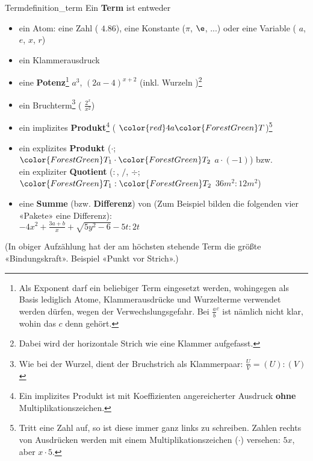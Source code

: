 \begin{definition}{Term}{definition_term}
  Ein \textbf{Term} ist entweder
  \begin{itemize}
  \item ein Atom: eine Zahl (\zB{} $4.86$), eine Konstante
    ($\pi$, $\e$, ...) oder  eine Variable (\zB{}   $a$, $e$, $x$, $r$)
  \item ein Klammerausdruck  
   \item eine \textbf{Potenz}\footnote{Als Exponent darf
     ein beliebiger Term eingesetzt werden, wohingegen als Basis
     lediglich Atome, Klammerausdrücke und Wurzelterme verwendet
     werden dürfen, wegen der Verwechslungsgefahr. Bei
     ${\frac{a}{b}}^c$ ist nämlich nicht klar, wohin das $c$ denn
     gehört.}
      \zB{}
     $a^3$, $(2a - 4)^{x+2}$ (inkl.  Wurzeln )\footnote{Dabei wird der
  horizontale Strich wie eine Klammer aufgefasst.}
    \item  ein Bruchterm\footnote{Wie bei der Wurzel, dient der Bruchstrich als Klammerpaar: $\frac{U}{V}=(U):(V)$} ( \zB{} $\frac{2^x}{x^2}$)
    \item ein implizites \textbf{Produkt}\footnote{Ein implizites
      Produkt ist mit Koeffizienten angereicherter Ausdruck
      \textbf{ohne} Multiplikationszeichen.} (\zB{}
      ${\color{red}4a}{\color{ForestGreen}T}$)\footnote{Tritt eine Zahl auf,
      so ist diese immer ganz links zu schreiben. Zahlen rechts von
      Ausdrücken werden mit einem Multiplikationszeichen ($\cdot$) versehen: $5x$, aber $x\cdot{}5$.}
    \item ein explizites \textbf{Produkt} ($\cdot$;
      ${\color{ForestGreen}T_1}\cdot {\color{ForestGreen}T_2}$ \zB{}
      $a\cdot(-1)$) bzw.\\ ein expliziter
      \textbf{Quotient} ($:$, $/$, $\div$; ${\color{ForestGreen}T_1}:{\color{ForestGreen}T_2}$ \zB{} $36m^2:12m^2$)
  \item eine \textbf{Summe} (bzw. \textbf{Differenz}) von 
  (Zum Beispiel bilden die folgenden
  vier «Pakete» eine Differenz):\\
  $-4x^2 + \frac{3a+b}{x} + \sqrt{5y^2-6} - 5t:2t$

    \end{itemize}
(In obiger Aufzählung hat der am höchsten stehende Term die größte
«Bindungskraft». Beispiel «Punkt vor Strich».)
\end{definition}

